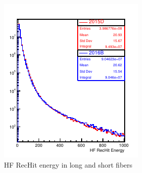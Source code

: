 \begin{figure}[!h]
\begin{minipage}[b]{0.48\linewidth}
\includegraphics[width=0.9\linewidth]{../Figures/Chap2/ImageFiles_HF/BasicPics/Comp2015vs2016B/RecHitE_2015DPUwt_2016B.pdf}
\captionsetup{width=.9\linewidth}
\caption{HF RecHit energy in long and short fibers}
\label{RecHitE_2015DPUwt_2016B}
\end{minipage}
\end{figure}
